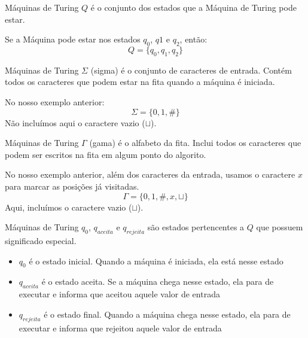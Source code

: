 \documentclass{beamer}
\begin{document}
\begin{frame}{Máquinas de Turing}
	$Q$ é o conjunto dos estados que a Máquina de Turing pode estar.
	\begin{center}
		\renewcommand{\TuringInput} {0,1,0,\#,0,1,0,$\sqcup$}
		\renewcommand{\TuringHead} 1
		\renewcommand{\TuringState} {$q_{0}$}
		\renewcommand{\TuringRightEnd} {$\ldots$}
		\renewcommand{\TuringLeftEnd} {}
		\TuringMachine
	\end{center}
	Se a Máquina pode estar nos estados $q_{0}$, $q{1}$ e $q_{2}$, então:
	\begin{equation*}
		Q = \{q_{0}, q_{1}, q_{2}\}
	\end{equation*}
\end{frame}
\begin{frame}{Máquinas de Turing}
	$\Sigma$ (sigma) é o conjunto de caracteres de entrada. Contém todos os caracteres que podem estar na fita quando a máquina é iniciada.
	\begin{center}
		\renewcommand{\TuringInput} {0,1,0,\#,0,1,0,$\sqcup$}
		\renewcommand{\TuringHead} 1
		\renewcommand{\TuringState} {$q_{0}$}
		\renewcommand{\TuringRightEnd} {$\ldots$}
		\renewcommand{\TuringLeftEnd} {}
		\TuringMachine
	\end{center}
	No nosso exemplo anterior:
	\begin{equation*}
	\Sigma = \{0, 1, \#\}
	\end{equation*}
	Não incluímos aqui o caractere vazio ($\sqcup$).
\end{frame}
\begin{frame}{Máquinas de Turing}
	$\Gamma$ (gama) é o alfabeto da fita. Inclui todos os caracteres que podem ser escritos na fita em algum ponto do algorito.
	\begin{center}
		\renewcommand{\TuringInput} {x,x,0,\#,x,x,0,$\sqcup$}
		\renewcommand{\TuringHead} 4
		\renewcommand{\TuringState} {$q_{0}$}
		\renewcommand{\TuringRightEnd} {$\ldots$}
		\renewcommand{\TuringLeftEnd} {}
		\TuringMachine
	\end{center}
	No nosso exemplo anterior, além dos caracteres da entrada, usamos o caractere $x$ para marcar as posições já visitadas.
	\begin{equation*}
	\Gamma = \{0, 1, \#, x, \sqcup\}
	\end{equation*}
	Aqui, incluímos o caractere vazio ($\sqcup$).
\end{frame}
\begin{frame}{Máquinas de Turing}
	$q_{0}$, $q_{aceita}$ e $q_{rejeita}$ são estados pertencentes a $Q$ que possuem significado especial.
	\begin{itemize}
		\item \textbf{$q_{0}$} é o estado inicial. Quando a máquina é iniciada, ela está nesse estado
		\item \textbf{$q_{aceita}$} é o estado aceita. Se a máquina chega nesse estado, ela para de executar e informa que \alert{aceitou} aquele valor de entrada
		\item \textbf{$q_{rejeita}$} é o estado final. Quando a máquina chega nesse estado, ela para de executar e informa que \alert{rejeitou} aquele valor de entrada
	\end{itemize}
\end{frame}
\end{document}
